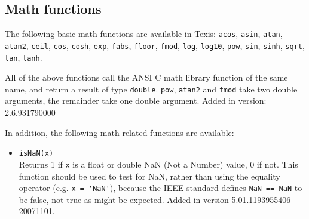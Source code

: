 \subsection{Math functions}

The following basic math functions are available in Texis:
\verb`acos`, \verb`asin`, \verb`atan`, \verb`atan2`, \verb`ceil`, \verb`cos`,
\verb`cosh`, \verb`exp`, \verb`fabs`, \verb`floor`, \verb`fmod`,
\verb`log`, \verb`log10`, \verb`pow`, \verb`sin`, \verb`sinh`, \verb`sqrt`,
\verb`tan`, \verb`tanh`.

All of the above functions call the ANSI C math library function
of the same name, and return a result of type \verb`double`.
\verb`pow`, \verb`atan2` and \verb`fmod` take two double arguments,
the remainder take one double argument.  Added in version:
2.6.931790000

In addition, the following math-related functions are available:

\begin{itemize}
  \item \verb`isNaN(x)` \\
    Returns 1 if \verb`x` is a float or double NaN (Not a Number) value,
    0 if not.  This function should be used to test for NaN, rather than
    using the equality operator (e.g. \verb`x = 'NaN'`), because the
    IEEE standard defines \verb`NaN == NaN` to be false, not true as
    might be expected.  Added in version 5.01.1193955406 20071101.
\end{itemize}

